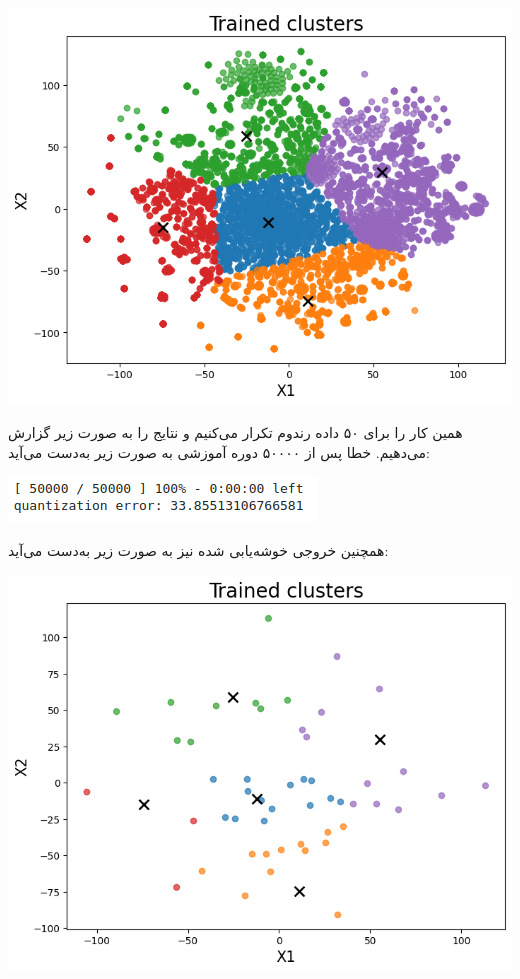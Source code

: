 \begin{enumerate}
	
	
	
	
	\begin{qsolve}
		
		\begin{center}
			\includegraphics*[width=0.6\linewidth]{pics/img18.png}
			\label{داده‌های خوشه‌بندی شده پس از آموزش}
		\end{center}
		
		همین کار را برای ۵۰ داده رندوم تکرار می‌کنیم و نتایج را به صورت زیر گزارش می‌دهیم. خطا پس از ۵۰۰۰۰ دوره آموزشی به صورت زیر به‌دست می‌آید:
		
		\begin{center}
			\includegraphics*[width=0.6\linewidth]{pics/img19.png}
			\label{خطای شبکه برای داده‌های رندوم}
		\end{center}
		
		همچنین خروجی خوشه‌یابی شده نیز به صورت زیر به‌دست می‌آيد:
		
		\begin{center}
			\includegraphics*[width=0.6\linewidth]{pics/img20.png}
			\label{داده‌های خوشه‌بندی شده پس از آموزش برای داده‌های رندوم}
		\end{center}
		

\end{qsolve}
\end{enumerate}
